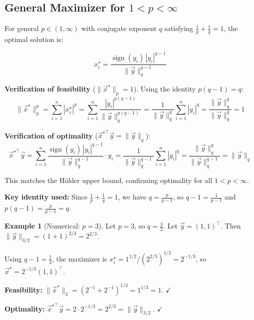 \documentclass[10pt, twocolumn]{article}
\theoremstyle{definition}
\newtheorem{example}{Example}
\theoremstyle{plain}
\DeclareMathOperator{\sign}{sign}
\begin{document}
\subsection{General Maximizer for $1 < p < \infty$}

For general $p \in (1, \infty)$ with conjugate exponent $q$ satisfying $\frac{1}{p} + \frac{1}{q} = 1$, the optimal solution is:

\begin{result}
\[
    x_i^\star = \frac{\sign(y_i) \, |y_i|^{q-1}}{\|\vec{y}\|_q^{q-1}}
\]
\end{result}

\textbf{Verification of feasibility} ($\|\vec{x}^\star\|_p = 1$). Using the identity $p(q-1) = q$:
\[
    \|\vec{x}^\star\|_p^p = \sum_{i=1}^{n} |x_i^\star|^p = \sum_{i=1}^{n} \frac{|y_i|^{p(q-1)}}{\|\vec{y}\|_q^{p(q-1)}} = \frac{1}{\|\vec{y}\|_q^q} \sum_{i=1}^{n} |y_i|^q = \frac{\|\vec{y}\|_q^q}{\|\vec{y}\|_q^q} = 1
\]

\textbf{Verification of optimality} ($\vec{x}^{\star\top} \vec{y} = \|\vec{y}\|_q$):
\[
    \vec{x}^{\star\top} \vec{y} = \sum_{i=1}^{n} \frac{\sign(y_i) \, |y_i|^{q-1}}{\|\vec{y}\|_q^{q-1}} \cdot y_i = \frac{1}{\|\vec{y}\|_q^{q-1}} \sum_{i=1}^{n} |y_i|^q = \frac{\|\vec{y}\|_q^q}{\|\vec{y}\|_q^{q-1}} = \|\vec{y}\|_q
\]

This matches the H\"{o}lder upper bound, confirming optimality for all $1 < p < \infty$.

\begin{tcolorbox}[colframe=black!50]
\textbf{Key identity used:} Since $\frac{1}{p} + \frac{1}{q} = 1$, we have $q = \frac{p}{p-1}$, so $q - 1 = \frac{1}{p-1}$ and $p(q-1) = \frac{p}{p-1} = q$.
\end{tcolorbox}

\begin{example}[Numerical: $p = 3$]
Let $p = 3$, so $q = \frac{3}{2}$. Let $\vec{y} = (1, 1)^\top$. Then $\|\vec{y}\|_{3/2} = (1 + 1)^{2/3} = 2^{2/3}$.

Using $q - 1 = \frac{1}{2}$, the maximizer is $x_i^\star = 1^{1/2} / (2^{2/3})^{1/2} = 2^{-1/3}$, so $\vec{x}^\star = 2^{-1/3}(1, 1)^\top$.

\textbf{Feasibility:} $\|\vec{x}^\star\|_3 = (2^{-1} + 2^{-1})^{1/3} = 1^{1/3} = 1$. $\checkmark$

\textbf{Optimality:} $\vec{x}^{\star\top} \vec{y} = 2 \cdot 2^{-1/3} = 2^{2/3} = \|\vec{y}\|_{3/2}$. $\checkmark$
\end{example}
\end{document}
